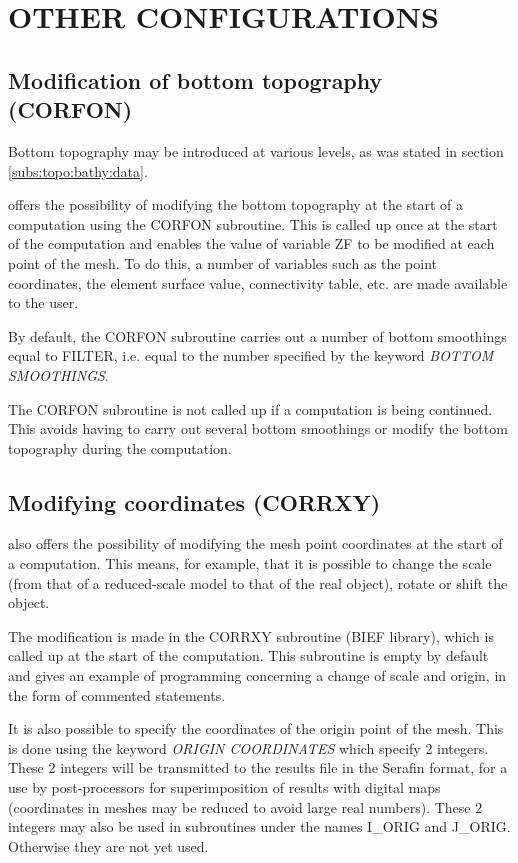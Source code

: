 
\chapter{  OTHER CONFIGURATIONS}
\label{ch:oth:conf}

\section{ Modification of bottom topography (CORFON)}
\label{sec:mod:bott:topo}
 Bottom topography may be introduced at various levels, as was stated in section \ref{subs:topo:bathy:data}.

 offers the possibility of modifying the bottom topography at the start of a computation using the CORFON subroutine. This is called up once at the start of the computation and enables the value of variable ZF to be modified at each point of the mesh. To do this, a number of variables such as the point coordinates, the element surface value, connectivity table, etc. are made available to the user.

 By default, the CORFON subroutine carries out a number of bottom smoothings equal to FILTER, i.e. equal to the number specified by the keyword \textit{BOTTOM SMOOTHINGS}.

 The CORFON subroutine is not called up if a computation is being continued. This avoids having to carry out several bottom smoothings or modify the bottom topography during the computation.


\section{ Modifying coordinates (CORRXY)}

  also offers the possibility of modifying the mesh point coordinates at the start of a computation. This means, for example, that it is possible to change the scale (from that of a reduced-scale model to that of the real object), rotate or shift the object.

 The modification is made in the CORRXY subroutine (BIEF library), which is called up at the start of the computation. This subroutine is empty by default and gives an example of programming concerning a change of scale and origin, in the form of commented statements.

 It is also possible to specify the coordinates of the origin point of the mesh. This is done using the keyword \textit{ORIGIN COORDINATES} which specify 2 integers. These 2 integers will be transmitted to the results file in the Serafin format, for a use by post-processors for superimposition of results with digital maps (coordinates in meshes may be reduced to avoid large real numbers). These 2 integers may also be used in subroutines under the names I\_ORIG and J\_ORIG. Otherwise they are not yet used.


